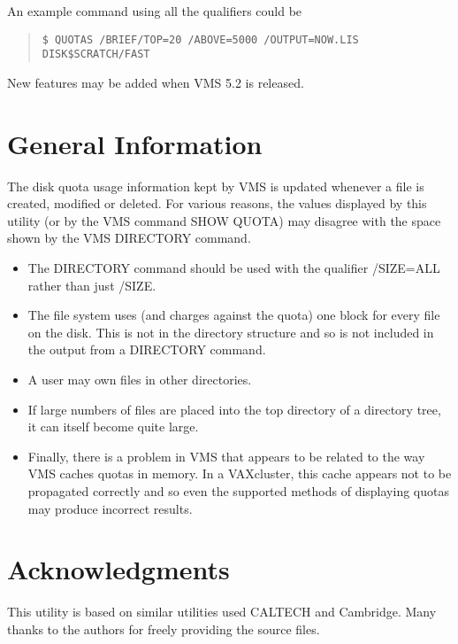 An example command using all the qualifiers could be
\begin{quote}
\begin{verbatim}
$ QUOTAS /BRIEF/TOP=20 /ABOVE=5000 /OUTPUT=NOW.LIS DISK$SCRATCH/FAST
\end{verbatim}
\end{quote}

New features may be added when VMS 5.2 is released.

\section{General Information}

The disk quota usage information kept by VMS is updated whenever a file is
created, modified or deleted. For various reasons, the values displayed
by this utility (or by the VMS command SHOW QUOTA) may disagree with the
space shown by the VMS DIRECTORY command.

\begin{itemize}

\item The DIRECTORY command should be used with the qualifier /SIZE=ALL
rather than just /SIZE.

\item The file system uses (and charges against the quota) one block for
every file on the disk.
This is not in the directory structure and so is not included in the output
from a DIRECTORY command.

\item A user may own files in other directories.

\item If large numbers of files are placed into the top directory of a
directory tree, it can itself become quite large.

\item Finally, there is a problem in VMS that appears to be related to
the way VMS caches quotas in memory.
In a VAXcluster, this cache appears not to be propagated correctly and so
even the supported methods of displaying quotas may produce incorrect results.
\end{itemize}

\section{Acknowledgments}

This utility is based on similar utilities used CALTECH and Cambridge.
Many thanks to the authors for freely providing the source files.



